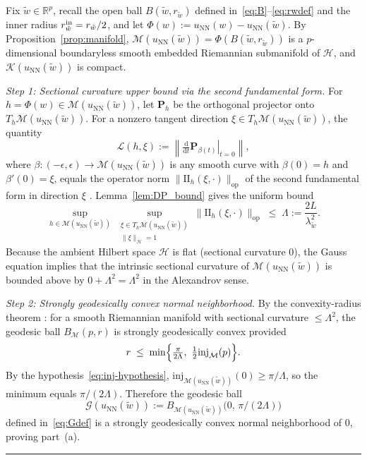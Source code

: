 \documentclass[twoside,11pt]{article}
\newcommand{\BlackBoxProof}{\rule{1.5ex}{1.5ex}}
\renewenvironment{proof}{\par\noindent{\bf Proof\ }}{\hfill\BlackBoxProof\par\medskip}
\newcommand{\R}{\mathbb{R}}
\renewcommand{\P}{\mathbf{P}}
\newcommand{\ud}{\mathrm{d}}
\newcommand{\NN}{\mathrm{NN}}
\newcommand{\calG}{\mathcal{G}}
\newcommand{\calH}{\mathcal{H}}
\newcommand{\calK}{\mathcal{K}}
\newcommand{\calM}{\mathcal{M}}
\begin{document}
\begin{proof}
Fix $\tilde w \in \R^p$, recall the open ball $B(\tilde w,r_{\tilde w})$ defined in~\eqref{eq:B}--\eqref{eq:rwdef} and the inner radius $r^{\rm in}_{\tilde w} = r_{\tilde w}/2$, and let $\Phi(w) := u_\NN(w)-u_\NN(\tilde w)$. By Proposition~\ref{prop:manifold}, $\calM(u_\NN(\tilde w)) = \Phi(B(\tilde w,r_{\tilde w}))$ is a $p$-dimensional boundaryless smooth embedded Riemannian submanifold of $\calH$, and $\calK(u_\NN(\tilde w))$ is compact.

\emph{Step 1: Sectional curvature upper bound via the second fundamental form.}
For $h=\Phi(w)\in \mathcal M(u_\NN(\tilde w))$, let $\P_h$ be the orthogonal projector onto $T_h\mathcal M(u_\NN(\tilde w))$. For a nonzero tangent direction $\xi\in T_h\mathcal M(u_\NN(\tilde w))$, the quantity
\[
\mathcal L(h,\xi) := \left\|\left.\tfrac{\ud}{\ud t}\P_{\beta(t)}\right|_{t=0}\right\|,
\]
where $\beta:(-\epsilon,\epsilon)\to \mathcal M(u_\NN(\tilde w))$ is any smooth curve with $\beta(0)=h$ and $\beta'(0)=\xi$, equals the operator norm $\|\mathrm{II}_h(\xi,\cdot)\|_{\mathrm{op}}$ of the second fundamental form in direction $\xi$ \citep{docarmo1992riemannian}. Lemma~\ref{lem:DP_bound} gives the uniform bound
\begin{equation}\label{eq:LambdaBound}
\sup_{h\in\mathcal M(u_\NN(\tilde w))}\,
\sup_{\substack{\xi \in T_h\mathcal M(u_\NN(\tilde w))\\\|\xi\|_\calH=1}}\!
\|\mathrm{II}_h(\xi,\cdot)\|_{\mathrm{op}} \;\le\; \Lambda := \frac{2L}{\lambda_{\tilde w}^2}.
\end{equation}
Because the ambient Hilbert space $\mathcal H$ is flat (sectional curvature $0$), the Gauss equation \citep[Theorem~1]{alexander2006gauss} implies that the intrinsic sectional curvature of $\calM(u_\NN(\tilde w))$ is bounded above by $0 + \Lambda^2 = \Lambda^2$ in the Alexandrov sense.

\emph{Step 2: Strongly geodesically convex normal neighborhood.}
By the convexity-radius theorem \citep[Theorem~5.14]{cheeger2008comparison}: for a smooth Riemannian manifold with sectional curvature $\le \Lambda^2$, the geodesic ball $B_\calM(p,r)$ is strongly geodesically convex provided
\[
r \;\le\; \min\Bigl\{\tfrac{\pi}{2\Lambda},\ \tfrac{1}{2}\mathrm{inj}_\calM(p)\Bigr\}.
\]
By the hypothesis~\eqref{eq:inj-hypothesis}, $\mathrm{inj}_{\calM(u_\NN(\tilde w))}(0)\ge \pi/\Lambda$, so the minimum equals $\pi/(2\Lambda)$. Therefore the geodesic ball
\[
    \calG(u_\NN(\tilde w)) := B_{\calM(u_\NN(\tilde w))}\bigl(0,\,\pi/(2\Lambda)\bigr)
\]
defined in~\eqref{eq:Gdef} is a strongly geodesically convex normal neighborhood of $0$, proving part~(a).


\end{proof}
\end{document}
